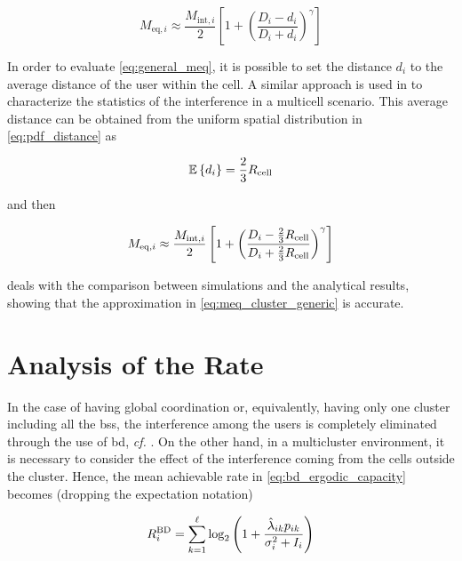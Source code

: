 \begin{equation} \label{eq:general_meq}
    M_{\text{eq}, i} \approx \frac{M_{\text{int}, i}}{2} \left[ 1 + \left(
    \frac{D_i - d_i}{D_i + d_i}\right)^\gamma\right]
\end{equation}

In order to evaluate \eqref{eq:general_meq}, it is possible to set the distance
$d_i$ to the average distance of the user within the cell. A similar approach is
used in \cite{pijcke11} to characterize the statistics of the interference in a
multicell scenario. This average distance can be obtained from the uniform
spatial distribution in \eqref{eq:pdf_distance} as

\begin{equation} \label{eq:average_distance}
    \mathbb{E}\left\{d_i\right\} = \frac{2}{3}R_{\text{cell}}
\end{equation}

\noindent
and then

\begin{equation} \label{eq:meq_cluster_generic}
    M_{\text{eq}, i} \approx \frac{M_{\text{int},i}}{2} \left[ 1 + \left(
        \frac{D_i - \frac{2}{3}R_{\text{cell}}}
        {D_i + \frac{2}{3}R_{\text{cell}}}\right)^\gamma\right]
\end{equation}

 deals with the comparison between simulations and
the analytical results, showing that the approximation in
\eqref{eq:meq_cluster_generic} is accurate.


\section{Analysis of the Rate}\label{sec:achiev_rate_analysis}

In the case of having global coordination or, equivalently, having only one
cluster including all the \glspl{bs}, the interference among the users is
completely eliminated through the use of \gls{bd}, \emph{cf.} . On
the other hand, in a multicluster environment, it is necessary to consider the
effect of the interference coming from the cells outside the cluster. Hence, the
mean achievable rate in \eqref{eq:bd_ergodic_capacity} becomes (dropping the
expectation notation)

\begin{equation} \label{eq:rate_bd_interf}
    R_i^{\text{BD}} = \sum\limits_{k = 1}^{\ell} \log_2 \left(1 +
        \frac{\hat{\lambda}_{ik} p_{ik}}{\sigma_i^2 + I_i} \right)
\end{equation}

